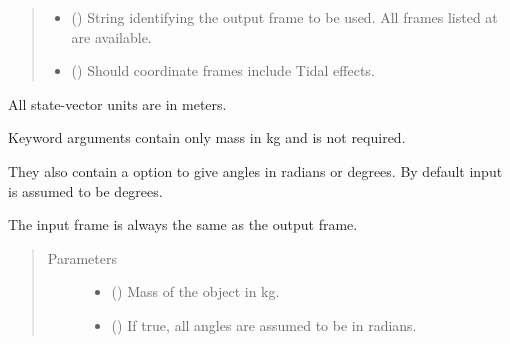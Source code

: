 \documentclass[letterpaper,10pt,english]{sphinxmanual}
\begin{document}
\begin{fulllineitems}
\begin{quote}
\begin{description}
\begin{itemize}
\item {} 
 () \textendash{} 
String identifying the output frame to be used. All frames listed at  are available.


\item {} 
 () \textendash{} Should coordinate frames include Tidal effects.

\end{itemize}

\end{description}\end{quote}

\begin{fulllineitems}
\label{\detokenize{modules/propagator_kepler:propagator_kepler.PropagatorKepler.get_orbit}}

All state-vector units are in meters.

Keyword arguments contain only mass  in kg and is not required.

They also contain a option to give angles in radians or degrees. By default input is assumed to be degrees.


The input frame is always the same as the output frame.
\begin{quote}\begin{description}
\item[{Parameters}] \leavevmode\begin{itemize}
\item {} 
 () \textendash{} Mass of the object in kg.

\item {} 
 () \textendash{} If true, all angles are assumed to be in radians.


\end{itemize}
\end{description}
\end{quote}
\end{fulllineitems}
\end{fulllineitems}
\end{document}

